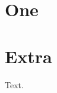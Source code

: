 \documentclass{article}
\begin{document}
\section{One}
\appendix
\section{Extra}
Text.
\end{document}
